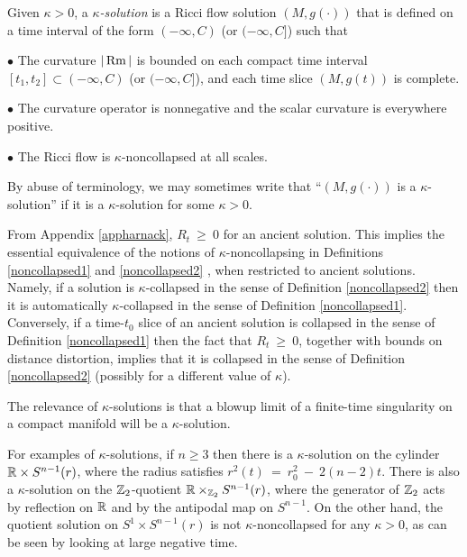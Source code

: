 \begin{definition}
  \label{def:kl-solutions-kappa-noncollapsing}

Given $\kappa > 0$, a {\em $\kappa$-solution} is a Ricci flow
solution $(M,g(\cdot))$ that is defined on a time interval of the
form $(-\infty,C)$
(or $(-\infty,C]$)
such that

$\bullet$ The curvature $|\operatorname{Rm}|$ is bounded on each compact time interval
$[t_1,t_2]\subset (-\infty,C)$
(or $(-\infty,C]$), and each time slice $(M,g(t))$ is complete.

$\bullet$ The curvature operator is nonnegative and the scalar curvature
is everywhere positive.

$\bullet$ The Ricci flow is $\kappa$-noncollapsed at all scales.
\end{definition}


By abuse of terminology, we may sometimes write that
``$(M, g(\cdot))$ is a $\kappa$-solution'' if it is a $\kappa$-solution
for some $\kappa > 0$.


From Appendix \ref{appharnack},
$R_t  \:  \ge \: 0$ for an ancient solution.
This implies the essential equivalence of the notions of
$\kappa$-noncollapsing in
Definitions \ref{noncollapsed1} and \ref{noncollapsed2} , when
restricted to ancient solutions.
Namely, if a solution is $\kappa$-collapsed in the sense of
Definition \ref{noncollapsed2} then it is
automatically $\kappa$-collapsed in the sense of
Definition \ref{noncollapsed1}.  Conversely,
if a time-$t_0$ slice of an ancient solution is collapsed in the sense
of Definition \ref{noncollapsed1}
then the fact that $R_t  \:  \ge \: 0$, together with bounds on
distance distortion, implies that it is collapsed in the sense of
Definition \ref{noncollapsed2} (possibly for a different value of $\kappa$).

The relevance of $\kappa$-solutions is that a blowup limit of a
finite-time singularity on a compact manifold will be a $\kappa$-solution.

For examples of $\kappa$-solutions, if $n \ge 3$ then
there is a $\kappa$-solution
on the cylinder ${\mathbb R} \times S^{n-1}(r)$,
where the radius satisfies $r^2(t) \: = \: r_0^2 \: - \:
2(n-2)t$. There is also a $\kappa$-solution on the
${\mathbb Z}_2$-quotient ${\mathbb R} \times_{{\mathbb Z}_2} S^{n-1}(r)$, where
the generator of ${\mathbb Z}_2$ acts by reflection on ${\mathbb R}$ and by
the antipodal map on $S^{n-1}$.
On the other hand,  the quotient solution on
$S^1 \times S^{n-1}(r)$ is not $\kappa$-noncollapsed for any
$\kappa > 0$,
as can be seen by looking at large negative time.

